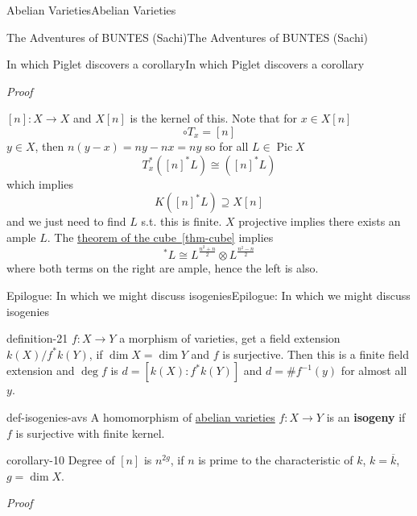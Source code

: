 \documentclass[10pt,]{book}
\makeatletter
\newcommand{\terminology}[1]{\textbf{#1}}
\renewcommand*{\proofname}{Proof}
\renewenvironment{proof}[1][\proofname]{\par
  \pushQED{\qed}%
  \normalfont \topsep6\p@\@plus6\p@\relax
  \trivlist
  \item\relax
    {\itshape
    #1\@addpunct{.}}\hspace\labelsep\ignorespaces
}{%
  \popQED\endtrivlist\@endpefalse
}
\numberwithin{equation}{section}
\newcommand{\lb}{[}
\newcommand{\rb}{]}
\DeclareMathOperator{\Pic}{Pic}
\makeatother
\begin{document}
\begin{chapterptx}{Abelian Varieties}{}{Abelian Varieties}{}{}
\begin{sectionptx}{The Adventures of BUNTES (Sachi)}{}{The Adventures of BUNTES (Sachi)}{}{}
\begin{subsectionptx}{In which Piglet discovers a corollary}{}{In which Piglet discovers a corollary}{}{}
\begin{proof}
\hypertarget{p-158}{}%
\([n]\colon X \to X\) and \(X[n]\) is the kernel of this. Note that for \(x\in X[n]\)%
\begin{equation*}
[n]\circ T_x = [n]
\end{equation*}
\(y\in X\), then \(n(y-x) = ny - nx = ny\) so for all \(L \in \Pic X\)%
\begin{equation*}
T_x^*([n]^* L ) \cong ([n]^* L)
\end{equation*}
which implies%
\begin{equation*}
K([n]^* L ) \supseteq X[n]
\end{equation*}
and we just need to find \(L\) s.t. this is finite. \(X\) projective implies there exists an ample \(L\). The \hyperref[thm-cube]{theorem of the cube~\ref{thm-cube}} implies%
\begin{equation*}
[n]^*L \cong L^{\frac{n^2 + n}{2}} \otimes L^{\frac{n^2 - n}{2}}
\end{equation*}
where both terms on the right are ample, hence the left is also.%
\end{proof}
\end{subsectionptx}
%
%
\typeout{************************************************}
\typeout{************************************************}
%
\begin{subsectionptx}{Epilogue: In which we might discuss isogenies}{}{Epilogue: In which we might discuss isogenies}{}{}\label{subsection-18}
\begin{definition}{}{definition-21}%
\hypertarget{p-159}{}%
\(f\colon X \to Y\) a morphism of varieties, get a field extension \(k(X)/f^*k(Y)\), if \(\dim X = \dim Y\) and \(f\) is surjective. Then this is a finite field extension and \(\deg f\) is \(d = \lb k(X) : f^*k(Y)\rb\) and \(d = \#f^{-1}(y)\) for almost all \(y\).%
\end{definition}
\begin{definition}{}{def-isogenies-avs}%
\hypertarget{p-160}{}%
A homomorphism of \hyperref[def-buntes-abvar]{abelian varieties} \(f\colon X \to Y\) is an \terminology{isogeny} if \(f\) is surjective with finite kernel.%
\end{definition}
\begin{corollary}{}{}{corollary-10}%
\hypertarget{p-161}{}%
Degree of \(\lb n\rb\) is \(n^{2g}\), if \(n\) is prime to the characteristic of \(k\), \(k = \overline k\), \(g = \dim X\).%
\end{corollary}
\begin{proof}\hypertarget{proof-31}{}

\end{proof}
\end{subsectionptx}
\end{sectionptx}
\end{chapterptx}
\end{document}
